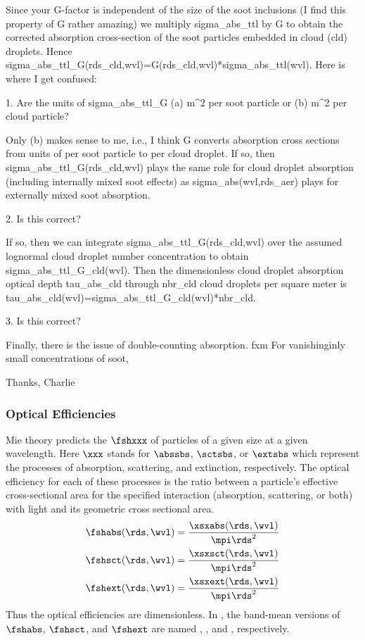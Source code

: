\documentclass[12pt]{article}
\begin{document}
{Since your G-factor is independent of the size of the soot inclusions
(I find this property of G rather amazing) we multiply sigma_abs_ttl
by G to obtain the corrected absorption cross-section of the soot
particles embedded in cloud (cld) droplets. 
Hence sigma_abs_ttl_G(rds_cld,wvl)=G(rds_cld,wvl)*sigma_abs_ttl(wvl).
Here is where I get confused:

1. Are the units of sigma_abs_ttl_G (a) m^2 per soot particle or
   (b) m^2 per cloud particle?

Only (b) makes sense to me, i.e., I think G converts absorption
cross sections from units of per soot particle to per cloud droplet.
If so, then sigma_abs_ttl_G(rds_cld,wvl) plays the same role for
cloud droplet absorption (including internally mixed soot effects)
as sigma_abs(wvl,rds_aer) plays for externally mixed soot absorption.  

2. Is this correct?

If so, then we can integrate sigma_abs_ttl_G(rds_cld,wvl) over
the assumed lognormal cloud droplet number concentration to obtain
sigma_abs_ttl_G_cld(wvl).
Then the dimensionless cloud droplet absorption optical depth
tau_abs_cld through nbr_cld cloud droplets per square meter is
tau_abs_cld(wvl)=sigma_abs_ttl_G_cld(wvl)*nbr_cld.

3. Is this correct?

Finally, there is the issue of double-counting absorption.
fxm
For vanishinginly small concentrations of soot, 

Thanks,
Charlie
} %

\subsubsection[Optical Efficiencies]{Optical Efficiencies}\label{sxn:fsh_opt}
Mie theory predicts the  $\fshxxx$ of
particles of a given size at a given wavelength. 
Here $\xxx$ stands for $\abssbs$, $\sctsbs$, or $\extsbs$ which
represent the processes of absorption, scattering, and extinction,
respectively. 
The optical efficiency for each of these processes is the ratio
between a particle's effective cross-sectional area for the specified
interaction (absorption, scattering, or both) with light and its
geometric cross sectional area. 
\begin{subequations}
\label{eqn:fsh_opt}
\begin{align}
\label{eqn:fsh_abs_dfn}
\fshabs(\rds,\wvl) & = \frac{\xsxabs(\rds,\wvl)}{\mpi \rds^{2}} \\
\label{eqn:fsh_sct_dfn}
\fshsct(\rds,\wvl) & = \frac{\xsxsct(\rds,\wvl)}{\mpi \rds^{2}} \\
\label{eqn:fsh_ext_dfn}
\fshext(\rds,\wvl) & = \frac{\xsxext(\rds,\wvl)}{\mpi \rds^{2}}
\end{align}
\end{subequations} 
Thus the optical efficiencies are dimensionless.
In , the band-mean versions of $\fshabs$, $\fshsct$, and 
$\fshext$ are named , , and
, respectively. 
\end{document}

